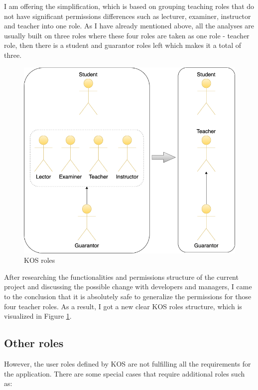 \noindent I am offering the simplification, which is based on grouping teaching roles that do not have significant permissions differences such as lecturer, examiner, instructor and teacher into one role. As I have already mentioned above, all the analyses are usually built on three roles where these four roles are taken as one role - teacher role, then there is a student and guarantor roles left which makes it a total of three.\\

\begin{figure}[h]
\centering
\includegraphics[scale=0.52]{../png/kos_roles.png}
\caption{KOS roles}\label{picture:kos_roles}
\end{figure}


\noindent After researching the functionalities and permissions structure of the current project and discussing the possible change with developers and managers, I came to the conclusion that it is absolutely safe to generalize the permissions for those four teacher roles. As a result, I got a new clear KOS roles structure, which is visualized in Figure \ref{picture:kos_roles}.




\subsection{Other roles}

\noindent However, the user roles defined by KOS are not fulfilling all the requirements for the application. There are some special cases that require additional roles such as:

